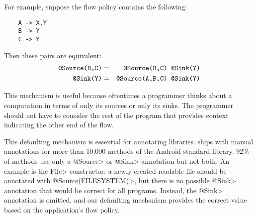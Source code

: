 For example, suppose the flow policy contains the following:

\begin{Verbatim}
    A -> X,Y
    B -> Y
    C -> Y
\end{Verbatim}
  
\noindent 
Then these pairs are equivalent:
\begin{eqnarray*}
  \mbox{\<@Source({B,C})>} & = & \mbox{\<@Source({B,C}) @Sink(Y)>} \\
  \mbox{\<@Sink(Y)>}       & = & \mbox{\<@Source({A,B,C}) @Sink(Y)>}
\end{eqnarray*}

This mechanism is useful because oftentimes a programmer thinks about a
computation in terms of only its sources or only its sinks.
The programmer should not have to consider the rest of the program
that provides context indicating the other end of the flow.

\newcommand{\FCnumstubmethods}{10,553\xspace}
\newcommand{\FCnumstubmethodsrounded}{10,000\xspace}
\newcommand{\FCnumstubmethodswitheither}{915\xspace}
\newcommand{\FCnumstubmethodswithboth}{76\xspace}
\newcommand{\FCpercentstubmethodswithboth}{8\%\xspace}
\newcommand{\FCpercentstubmethodswithone}{92\%\xspace}

This defaulting mechanism is essential for annotating
libraries.  \TheFlowChecker ships with manual annotations for more than
\FCnumstubmethodsrounded methods of the Android standard library.
\FCpercentstubmethodswithone of methods use only a
\<@Source> or \<@Sink> annotation but not both.
An example is the \<File> constructor:
a newly-created readable file should be annotated with
\<@Source(FILESYSTEM)>, but there is no possible \<@Sink> annotation
that would be correct for all programs.
Instead, the \<@Sink> annotation is omitted, and
our defaulting mechanism provides the correct value
based on the application's flow policy.

